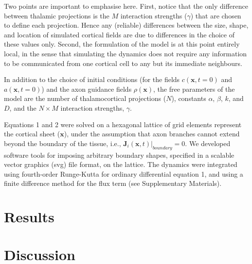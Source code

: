 \documentclass[a4paper,11pt]{article}
\newcommand{\mb}[1]{\mathbf{#1}}
\begin{document}
Two points are important to emphasise here. First, notice that the only difference between thalamic projections is the $M$ interaction strengths ($\gamma$) that are chosen to define each projection. Hence any (reliable) differences between the size, shape, and location of simulated cortical fields are due to differences in the choice of these values only. Second, the formulation of the model is at this point entirely local, in the sense that simulating the dynamics does not require any information to be communicated from one cortical cell to any but its immediate neighbours. 

In addition to the choice of initial conditions (for the fields $c(\mb{x},t=0)$ and $a(\mb{x},t=0)$) and the axon guidance fields $\rho(\mb{x})$, the free parameters of the model are the number of thalamocortical projections ($N$), constants $\alpha$, $\beta$, $k$, and $D$, and the $N\times M$ interaction strengths, $\gamma$. 

Equations 1 and 2 were solved on a hexagonal lattice of grid elements represent the cortical sheet ($\mb{x}$), under the assumption that axon branches cannot extend beyond the boundary of the tissue, i.e., $\mb{J}_i(\mb{x},t) \bigg\rvert_{boundary} = 0$. We developed software tools for imposing arbitrary boundary shapes, specified in a scalable vector graphics (svg) file format, on the lattice. The dynamics were integrated using fourth-order Runge-Kutta for ordinary differential equation 1, and using a {\color{red} finite difference method} for the flux term (see Supplementary Materials).



\section*{Results}






\section*{Discussion}
\end{document}

